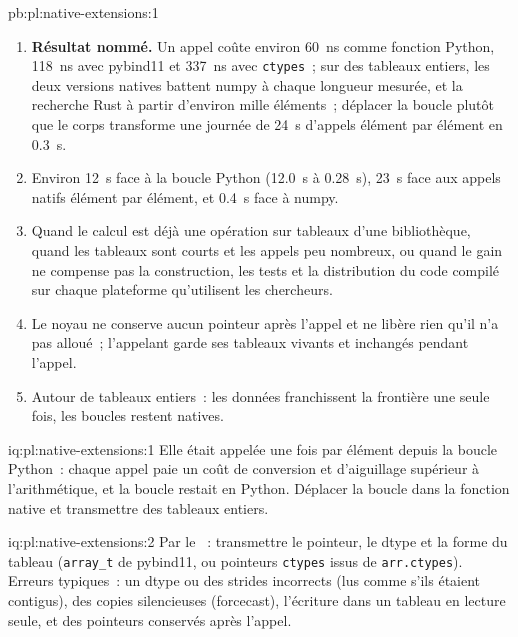 \begin{solution}{pb:pl:native-extensions:1}
\begin{enumerate}
\item \textbf{Résultat nommé.} Un appel coûte environ 60~ns comme fonction Python, 118~ns avec pybind11 et 337~ns avec \texttt{ctypes}~; sur
des tableaux entiers, les deux versions natives battent numpy à chaque longueur mesurée, et la recherche Rust à partir d'environ mille éléments~; déplacer la boucle plutôt que le corps
transforme une journée de 24~s d'appels élément par élément en 0.3~s.
\item Environ 12~s face à la boucle Python (12.0~s à 0.28~s), 23~s face aux appels natifs élément par élément, et 0.4~s face à numpy.
\item Quand le calcul est déjà une opération sur tableaux d'une bibliothèque, quand les tableaux sont courts et les appels peu nombreux, ou quand le gain ne
compense pas la construction, les tests et la distribution du code compilé sur chaque plateforme qu'utilisent les chercheurs.
\item Le noyau ne conserve aucun pointeur après l'appel et ne libère rien qu'il n'a pas alloué~; l'appelant garde ses tableaux vivants et inchangés
pendant l'appel.
\item Autour de tableaux entiers~: les données franchissent la frontière une seule fois, les boucles restent natives.
\end{enumerate}
\end{solution}

\begin{solution}{iq:pl:native-extensions:1}
Elle était appelée une fois par élément depuis la boucle Python~: chaque appel paie un coût de conversion et d'aiguillage supérieur à l'arithmétique, et la
boucle restait en Python. Déplacer la boucle dans la fonction native et transmettre des tableaux entiers.
\end{solution}

\begin{solution}{iq:pl:native-extensions:2}
Par le ~: transmettre le pointeur, le dtype et la forme du tableau (\texttt{array\_t} de pybind11, ou pointeurs \texttt{ctypes} issus de
\texttt{arr.ctypes}). Erreurs typiques~: un dtype ou des strides incorrects (lus comme s'ils étaient contigus), des copies silencieuses (forcecast), l'écriture dans un tableau en lecture seule, et des pointeurs
conservés après l'appel.
\end{solution}

